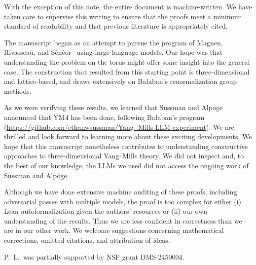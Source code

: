 With the exception of this note, the entire document is machine-written. We have taken care to supervise this writing to ensure that the proofs meet a minimum standard of readability and that previous literature is appropriately cited. 

The manuscript began as an attempt to pursue the program of Magnen, Rivasseau, and S{\'e}n{\'e}or~\cite{MagnenRivasseauSeneor1993} using large language models. Our hope was that understanding the problem on the torus might offer some insight into the general case. The construction that resulted from this starting point is three-dimensional and lattice-based, and draws extensively on Ba{\l}aban’s renormalization group methods.

As we were verifying these results, we learned that Sussman and Alp\"oge announced that YM4 has been done, following Ba{\l}aban’s program (\url{https://github.com/ethanwsussman/Yang--Mills-LLM-experiment}). We are thrilled and look forward to learning more about these exciting developments. We hope that this manuscript nonetheless contributes to understanding constructive approaches to three-dimensional Yang--Mills theory. We did not inspect and, to the best of our knowledge, the LLMs we used did not access the ongoing work of Sussman and Alp\"oge.

Although we have done extensive machine auditing of these proofs, including adversarial passes with multiple models, the proof is too complex for either (i) Lean autoformalization given the authors' resources or (ii) our own understanding of the results. Thus we are less confident in correctness than we are in our other work. We welcome suggestions concerning mathematical corrections, omitted citations, and attribution of ideas.

P.\ L.\ was partially supported by NSF grant DMS-2450004.
